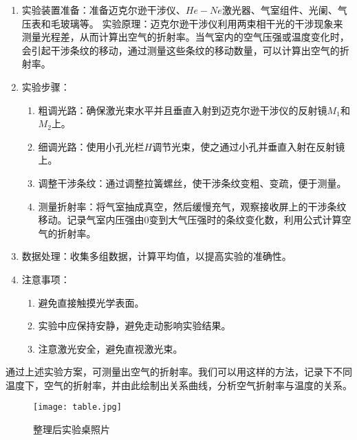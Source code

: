 \documentclass[dvipsnames, svgnames,a4paper,11pt]{article}
\begin{document}
	\begin{enumerate}
		\item 实验装置准备：准备迈克尔逊干涉仪、$He-Ne$激光器、气室组件、光阑、气压表和毛玻璃等。
		实验原理：迈克尔逊干涉仪利用两束相干光的干涉现象来测量光程差，从而计算出空气的折射率。当气室内的空气压强或温度变化时，会引起干涉条纹的移动，通过测量这些条纹的移动数量，可以计算出空气的折射率。
		\item 实验步骤：
		 	\begin{enumerate}[label=\roman*.]
				\item 粗调光路：确保激光束水平并且垂直入射到迈克尔逊干涉仪的反射镜$M_1$和$M_2$上。
				
				\item 细调光路：使用小孔光栏$H$调节光束，使之通过小孔并垂直入射在反射镜上。
				
				\item 调整干涉条纹：通过调整拉簧螺丝，使干涉条纹变粗、变疏，便于测量。
				
				\item 测量折射率：将气室抽成真空，然后缓慢充气，观察接收屏上的干涉条纹移动。记录气室内压强由0变到大气压强时的条纹变化数，利用公式计算空气的折射率。
			\end{enumerate}

		\item 数据处理：收集多组数据，计算平均值，以提高实验的准确性。
		 
		\item 注意事项：
			\begin{enumerate}[label=\roman*.]
				\item 避免直接触摸光学表面。
				\item 实验中应保持安静，避免走动影响实验结果。
				\item 注意激光安全，避免直视激光束。
			\end{enumerate}
	\end{enumerate}
	
	通过上述实验方案，可测量出空气的折射率。我们可以用这样的方法，记录下不同温度下，空气的折射率，并由此绘制出关系曲线，分析空气折射率与温度的关系。

	
	
	
	
	\begin{figure}[htbp]
		\centering
		\texttt{[image: table.jpg]}
		\caption{整理后实验桌照片}
		\label{fig:table}
	\end{figure}
	
\end{document}
